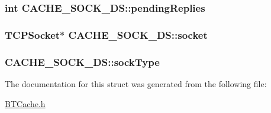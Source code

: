 \subsubsection[{pending\+Replies}]{\setlength{\rightskip}{0pt plus 5cm}int C\+A\+C\+H\+E\+\_\+\+S\+O\+C\+K\+\_\+\+D\+S\+::pending\+Replies}\label{structCACHE__SOCK__DS_a81e09cc8c39d46511f416537f0059905}
\hypertarget{structCACHE__SOCK__DS_a8b7dc6785db9ec4180a39a1f912704ea}{}
\subsubsection[{socket}]{\setlength{\rightskip}{0pt plus 5cm}T\+C\+P\+Socket$\ast$ C\+A\+C\+H\+E\+\_\+\+S\+O\+C\+K\+\_\+\+D\+S\+::socket}\label{structCACHE__SOCK__DS_a8b7dc6785db9ec4180a39a1f912704ea}
\hypertarget{structCACHE__SOCK__DS_aeb66061fd835019d9aa685d288b05fab}{}
\subsubsection[{sock\+Type}]{ C\+A\+C\+H\+E\+\_\+\+S\+O\+C\+K\+\_\+\+D\+S\+::sock\+Type}\label{structCACHE__SOCK__DS_aeb66061fd835019d9aa685d288b05fab}


The documentation for this struct was generated from the following file\+:\begin{DoxyCompactItemize}
\item 
\hyperlink{BTCache_8h}{B\+T\+Cache.\+h}\end{DoxyCompactItemize}
